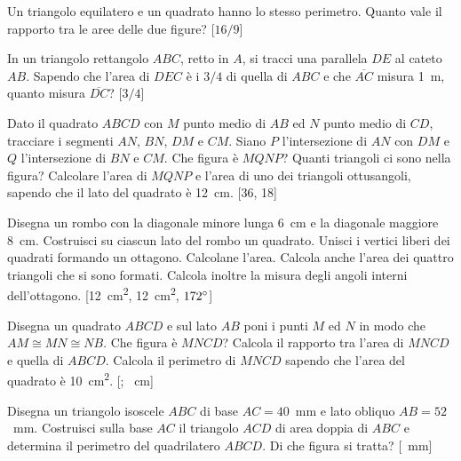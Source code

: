 \begin{multicols}{2}
\begin{esercizio}
\label{ese:7.41}
Un triangolo equilatero e un quadrato hanno lo stesso perimetro. Quanto vale il rapporto tra le aree delle due figure? 			[$16/9$]
\end{esercizio}

\begin{esercizio}
\label{ese:7.42}
In un triangolo rettangolo $ABC$, retto in $A$, si tracci una parallela $DE$ al cateto $AB$. Sapendo che l'area di $DEC$ è i $3/4$ di quella di $ABC$ e che $\overline{AC}$ misura 1~m, quanto misura $\overline{DC}$? [$3/4$]
\end{esercizio}

\begin{esercizio}
\label{ese:7.43}
Dato il quadrato $ABCD$ con $M$ punto medio di $AB$ ed $N$ punto medio di $CD$, tracciare i segmenti $AN$, $BN$, $DM$ e $CM$. Siano $P$ l'intersezione di $AN$ con $DM$ e $Q$ l'intersezione di $BN$ e $CM$. Che figura è $MQNP$? Quanti triangoli ci sono nella figura? Calcolare l'area di $MQNP$ e l'area di uno dei triangoli ottusangoli, sapendo che il lato del quadrato è 12~cm.
[36, 18]
\end{esercizio}

\begin{esercizio}
\label{ese:7.44}
Disegna un rombo con la diagonale minore lunga 6~cm e la diagonale maggiore 8~cm. Costruisci su ciascun lato del rombo un quadrato. Unisci i vertici liberi dei quadrati formando un ottagono. Calcolane l'area. Calcola anche l'area dei quattro triangoli che si sono formati. Calcola inoltre la misura degli angoli interni dell'ottagono.
[12~cm\textsuperscript{2}, 12~cm\textsuperscript{2}, $172{}^{\circ}$]
\end{esercizio}

\begin{esercizio}
\label{ese:7.45}
Disegna un quadrato $ABCD$ e sul lato $AB$ poni i punti $M$ ed $N$ in modo che $AM\cong MN\cong NB$. Che figura è $MNCD$? Calcola il rapporto tra l'area di $MNCD$ e quella di $ABCD$. Calcola il perimetro di $MNCD$ sapendo che l'area del quadrato è 10~cm\textsuperscript{2}.
[; ~cm]
\end{esercizio}

\begin{esercizio}
\label{ese:7.46}
Disegna un triangolo isoscele $ABC$ di base $AC=40$~mm e lato obliquo $AB=52$~mm. Costruisci sulla base $AC$ il triangolo $ACD$ di area doppia di $ABC$ e determina il perimetro del quadrilatero $ABCD$. Di che figura si tratta?
[~mm]
\end{esercizio}


\end{multicols}
